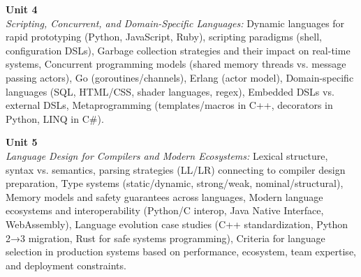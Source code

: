 \vspace{0.3cm}

\noindent\textbf{Unit 4} \\
\textit{Scripting, Concurrent, and Domain-Specific Languages:} Dynamic languages for rapid prototyping (Python, JavaScript, Ruby), scripting paradigms (shell, configuration DSLs), Garbage collection strategies and their impact on real-time systems, Concurrent programming models (shared memory threads vs. message passing actors), Go (goroutines/channels), Erlang (actor model), Domain-specific languages (SQL, HTML/CSS, shader languages, regex), Embedded DSLs vs. external DSLs, Metaprogramming (templates/macros in C++, decorators in Python, LINQ in C\#).

\vspace{0.3cm}

\noindent\textbf{Unit 5} \\
\textit{Language Design for Compilers and Modern Ecosystems:} Lexical structure, syntax vs. semantics, parsing strategies (LL/LR) connecting to compiler design preparation, Type systems (static/dynamic, strong/weak, nominal/structural), Memory models and safety guarantees across languages, Modern language ecosystems and interoperability (Python/C interop, Java Native Interface, WebAssembly), Language evolution case studies (C++ standardization, Python 2→3 migration, Rust for safe systems programming), Criteria for language selection in production systems based on performance, ecosystem, team expertise, and deployment constraints.

\newpage
{}
